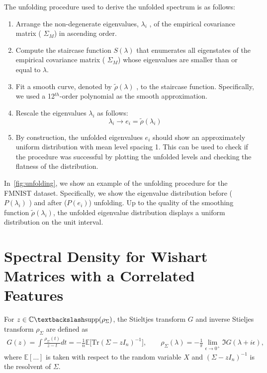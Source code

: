 \documentclass{article}
\DeclareMathOperator{\tr}{tr}
\def\tr{\textrm{Tr}}
\begin{document}
The unfolding procedure used to derive the unfolded spectrum is as follows:
\setlength{\belowdisplayskip}{2pt} 
\setlength{\belowdisplayshortskip}{2pt}
\setlength{\abovedisplayskip}{2pt} 
\setlength{\abovedisplayshortskip}{2pt}
\begin{enumerate}
\item Arrange the non-degenerate eigenvalues, $\lambda_i$ , of the empirical covariance matrix ( $\Sigma_M$) in ascending order.
\item Compute the staircase function $S(\lambda)$ that enumerates all eigenstates of the empirical covariance matrix ( $\Sigma_M$) whose eigenvalues are smaller than or equal to $\lambda$.
\item Fit a smooth curve, denoted by $\tilde{\rho}(\lambda)$ , to the staircase function. Specifically, we used a 12$^{th}$-order polynomial as the smooth approximation.
\item Rescale the eigenvalues $\lambda_i$ as follows:
\begin{equation}
        \label{eq:unfolded_spectrum}
    \lambda_i \rightarrow e_i = \tilde{\rho}(\lambda_i)
\end{equation}
\item By construction, the unfolded eigenvalues $e_i$ should show an approximately uniform distribution with mean level spacing 1. This can be used to check if the procedure was successful by plotting the unfolded levels and checking the flatness of the distribution.
\end{enumerate}

In~\cref{fig:unfolding}, we show an example of the unfolding procedure for the FMNIST dataset. Specifically, we show the eigenvalue distribution before ($P(\lambda_i)$ ) and after ($P(e_i)$) unfolding. Up to the quality of the smoothing function $\tilde{\rho}(\lambda_i)$, the unfolded eigenvalue distribution displays a uniform distribution on the unit interval.


\section{Spectral Density for Wishart Matrices with a Correlated Features}
\label{sec:wishart_density}


For $z \in \mathbb{C} \textbackslash \text{supp}( \rho_\Sigma)$, the Stieltjes transform $G$ and inverse Stieljes transform $\rho_\Sigma$ are defined as
\begin{align}
\label{eq:stieljes}
    G(z)
     = 
     \int \frac{\rho_\Sigma(t)}{z-t}dt
    =
    -\frac{1}{n}\mathbb{E}
    \big[
     \tr (\Sigma- z I_n )^{-1}
    \big],
    \qquad 
        \rho_\Sigma(\lambda)
    =
    -\frac{1}{\pi}
    \lim_{\epsilon \to 0^+}
    \Im
    G(\lambda+ i \epsilon),    
\end{align}
where $\mathbb{E}[\ldots]$ is taken with respect to the random variable $X$ and $(\Sigma- z I_n )^{-1}$
is the resolvent of $\Sigma$. 
\end{document}
